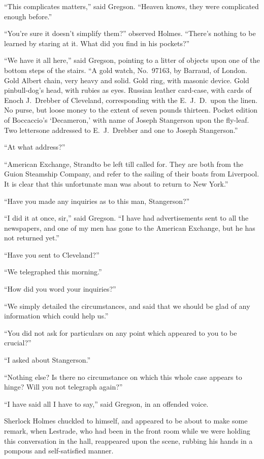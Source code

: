\documentclass[12pt,english]{book}
\begin{document}
{}``This complicates matters,'' said Gregson. {}``Heaven knows,
they were complicated enough before.''

{}``You're sure it doesn't simplify them?'' observed Holmes. {}``There's
nothing to be learned by staring at it. What did you find in his pockets?''

{}``We have it all here,'' said Gregson, pointing to a litter of
objects upon one of the bottom steps of the stairs. {}``A gold watch,
No.\ 97163, by Barraud, of London. Gold Albert chain, very heavy
and solid. Gold ring, with masonic device. Gold pin\mdsh{---}bull-dog's
head, with rubies as eyes. Russian leather card-case, with cards of
Enoch J.\ Drebber of Cleveland, corresponding with the E.\ J.\ D.\ upon
the linen. No purse, but loose money to the extent of seven pounds
thirteen. Pocket edition of Boccaccio's `Decameron,' with name of
Joseph Stangerson upon the fly-leaf. Two letters\mdsh{---}one addressed
to E.\ J.\ Drebber and one to Joseph Stangerson.''

{}``At what address?''

{}``American Exchange, Strand\mdsh{---}to be left till called for.
They are both from the Guion Steamship Company, and refer to the sailing
of their boats from Liverpool. It is clear that this unfortunate man
was about to return to New York.''

{}``Have you made any inquiries as to this man, Stangerson?''

{}``I did it at once, sir,'' said Gregson. {}``I have had advertisements
sent to all the newspapers, and one of my men has gone to the American
Exchange, but he has not returned yet.''

{}``Have you sent to Cleveland?''

{}``We telegraphed this morning.''

{}``How did you word your inquiries?''

{}``We simply detailed the circumstances, and said that we should
be glad of any information which could help us.''

{}``You did not ask for particulars on any point which appeared to
you to be crucial?''

{}``I asked about Stangerson.''

{}``Nothing else? Is there no circumstance on which this whole case
appears to hinge? Will you not telegraph again?''

{}``I have said all I have to say,'' said Gregson, in an offended
voice.

Sherlock Holmes chuckled to himself, and appeared to be about to make
some remark, when Lestrade, who had been in the front room while we
were holding this conversation in the hall, reappeared upon the scene,
rubbing his hands in a pompous and self-satisfied manner.
\end{document}
